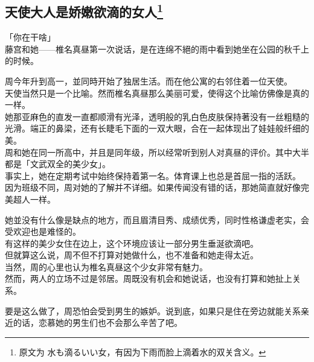 \subsection[天使大人是娇嫩欲滴的女人]{天使大人是娇嫩欲滴的女人\footnote{原文为 {\jpfont 水も滴るいい女}，有因为下雨而脸上滴着水的双关含义。}}

「你在干啥」\\

藤宫和她——椎名真昼第一次说话，是在连绵不絕的雨中看到她坐在公园的秋千上的时候。\\

\vspace{2\baselineskip}

周今年升到高一，並同時开始了独居生活。而在他公寓的右邻住着一位天使。\\

天使当然只是一个比喻。然而椎名真昼那么美丽可爱，使得这个比喻仿佛像是真的一样。\\

她那亚麻色的直发一直都顺滑有光泽，透明般的乳白色皮肤保持著没有一丝粗糙的光滑。端正的鼻梁，还有长睫毛下面的一双大眼，合在一起体现出了娃娃般纤细的美。\\

周和她在同一所高中，并且是同年级，所以经常听到别人对真昼的评价。其中大半都是「文武双全的美少女」。\\

事实上，她在定期考试中始终保持着第一名。体育课上也总是首屈一指的活跃。\\

因为班级不同，周对她的了解并不详细。如果传闻没有错的话，那她简直就好像完美超人一样。

她並没有什么像是缺点的地方，而且眉清目秀、成绩优秀，同时性格谦虚老实，会受欢迎也是难怪的。\\

有这样的美少女住在边上，这个环境应该让一部分男生垂涎欲滴吧。\\

但就算这么说，周不但不打算对她做什么，也不准备和她走得太近。\\

当然，周的心里也认为椎名真昼这个少女非常有魅力。\\

然而，两人的立场不过是邻居。周既没有机会和她说话，也没有打算和她扯上关系。

要是这么做了，周恐怕会受到男生的嫉妒。说到底，如果只是住在旁边就能关系亲近的话，恋慕她的男生们也不会那么辛苦了吧。\\

